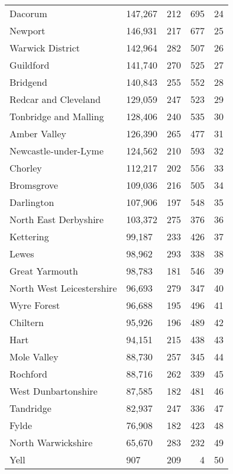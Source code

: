 \begin{tabular}{llrrr}
Dacorum                   &    147,267 &   212 &      695 &    24 \\
Newport                   &    146,931 &   217 &      677 &    25 \\
Warwick District          &    142,964 &   282 &      507 &    26 \\
Guildford                 &    141,740 &   270 &      525 &    27 \\
Bridgend                  &    140,843 &   255 &      552 &    28 \\
Redcar and Cleveland      &    129,059 &   247 &      523 &    29 \\
Tonbridge and Malling     &    128,406 &   240 &      535 &    30 \\
Amber Valley              &    126,390 &   265 &      477 &    31 \\
Newcastle-under-Lyme      &    124,562 &   210 &      593 &    32 \\
Chorley                   &    112,217 &   202 &      556 &    33 \\
Bromsgrove                &    109,036 &   216 &      505 &    34 \\
Darlington                &    107,906 &   197 &      548 &    35 \\
North East Derbyshire     &    103,372 &   275 &      376 &    36 \\
Kettering                 &     99,187 &   233 &      426 &    37 \\
Lewes                     &     98,962 &   293 &      338 &    38 \\
Great Yarmouth            &     98,783 &   181 &      546 &    39 \\
North West Leicestershire &     96,693 &   279 &      347 &    40 \\
Wyre Forest               &     96,688 &   195 &      496 &    41 \\
Chiltern                  &     95,926 &   196 &      489 &    42 \\
Hart                      &     94,151 &   215 &      438 &    43 \\
Mole Valley               &     88,730 &   257 &      345 &    44 \\
Rochford                  &     88,716 &   262 &      339 &    45 \\
West Dunbartonshire       &     87,585 &   182 &      481 &    46 \\
Tandridge                 &     82,937 &   247 &      336 &    47 \\
Fylde                     &     76,908 &   182 &      423 &    48 \\
North Warwickshire        &     65,670 &   283 &      232 &    49 \\
Yell                      &        907 &   209 &        4 &    50 \\
\bottomrule
\end{tabular}
